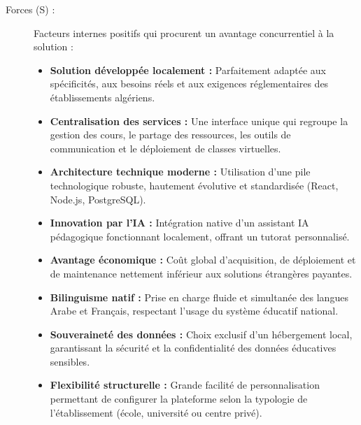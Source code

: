 \documentclass[12pt,a4paper,oneside]{report}
\begin{document}
\begin{description}
    \item[Forces (S) :] Facteurs internes positifs qui procurent un avantage concurrentiel à la solution :
    \begin{itemize}
        \item \textbf{Solution développée localement :} Parfaitement adaptée aux spécificités, aux besoins réels et aux exigences réglementaires des établissements algériens.
        \item \textbf{Centralisation des services :} Une interface unique qui regroupe la gestion des cours, le partage des ressources, les outils de communication et le déploiement de classes virtuelles.
        \item \textbf{Architecture technique moderne :} Utilisation d'une pile technologique robuste, hautement évolutive et standardisée (React, Node.js, PostgreSQL).
        \item \textbf{Innovation par l'IA :} Intégration native d'un assistant IA pédagogique fonctionnant localement, offrant un tutorat personnalisé.
        \item \textbf{Avantage économique :} Coût global d'acquisition, de déploiement et de maintenance nettement inférieur aux solutions étrangères payantes.
        \item \textbf{Bilinguisme natif :} Prise en charge fluide et simultanée des langues Arabe et Français, respectant l'usage du système éducatif national.
        \item \textbf{Souveraineté des données :} Choix exclusif d'un hébergement local, garantissant la sécurité et la confidentialité des données éducatives sensibles.
        \item \textbf{Flexibilité structurelle :} Grande facilité de personnalisation permettant de configurer la plateforme selon la typologie de l'établissement (école, université ou centre privé).
    \end{itemize}


\end{description}
\end{document}
